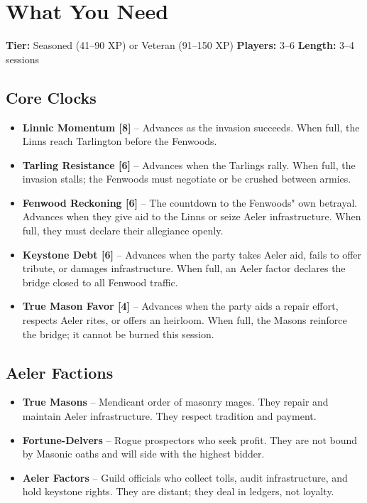 \documentclass[11pt]{book}
\begin{document}
\section*{What You Need}
\textbf{Tier:} Seasoned (41--90 XP) or Veteran (91--150 XP) \quad \textbf{Players:} 3--6 \quad \textbf{Length:} 3--4 sessions

\subsection*{Core Clocks}
\begin{itemize}
    \item \textbf{Linnic Momentum [8]} -- Advances as the invasion succeeds. When full, the Linns reach Tarlington before the Fenwoods.
    \item \textbf{Tarling Resistance [6]} -- Advances when the Tarlings rally. When full, the invasion stalls; the Fenwoods must negotiate or be crushed between armies.
    \item \textbf{Fenwood Reckoning [6]} -- The countdown to the Fenwoods" own betrayal. Advances when they give aid to the Linns or seize Aeler infrastructure. When full, they must declare their allegiance openly.
    \item \textbf{Keystone Debt [6]} -- Advances when the party takes Aeler aid, fails to offer tribute, or damages infrastructure. When full, an Aeler factor declares the bridge closed to all Fenwood traffic.
    \item \textbf{True Mason Favor [4]} -- Advances when the party aids a repair effort, respects Aeler rites, or offers an heirloom. When full, the Masons reinforce the bridge; it cannot be burned this session.
\end{itemize}

\subsection*{Aeler Factions}
\begin{itemize}
    \item \textbf{True Masons} -- Mendicant order of masonry mages. They repair and maintain Aeler infrastructure. They respect tradition and payment.
    \item \textbf{Fortune-Delvers} -- Rogue prospectors who seek profit. They are not bound by Masonic oaths and will side with the highest bidder.
    \item \textbf{Aeler Factors} -- Guild officials who collect tolls, audit infrastructure, and hold keystone rights. They are distant; they deal in ledgers, not loyalty.
\end{itemize}
\end{document}
